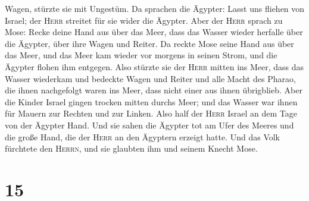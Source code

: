 Wagen, stürzte sie mit Ungestüm. Da sprachen die Ägypter: Lasst uns
fliehen von Israel; der \textsc{Herr} streitet für sie wider die
Ägypter.  Aber der \textsc{Herr} sprach zu Mose: Recke
deine Hand aus über das Meer, dass das Wasser wieder herfalle über die
Ägypter, über ihre Wagen und Reiter.  Da reckte Mose
seine Hand aus über das Meer, und das Meer kam wieder vor morgens in
seinen Strom, und die Ägypter flohen ihm entgegen. Also stürzte sie der
\textsc{Herr} mitten ins Meer,  dass das Wasser wiederkam
und bedeckte Wagen und Reiter und alle Macht des Pharao, die ihnen
nachgefolgt waren ins Meer, dass nicht einer aus ihnen übrigblieb.
 Aber die Kinder Israel gingen trocken mitten durchs
Meer; und das Wasser war ihnen für Mauern zur Rechten und zur Linken.
 Also half der \textsc{Herr} Israel an dem Tage von der
Ägypter Hand. Und sie sahen die Ägypter tot am Ufer des Meeres
 und die große Hand, die der \textsc{Herr} an den
Ägyptern erzeigt hatte. Und das Volk fürchtete den \textsc{Herrn}, und
sie glaubten ihm und seinem Knecht Mose.

\hypertarget{section-14}{%
\section{15}\label{section-14}}

